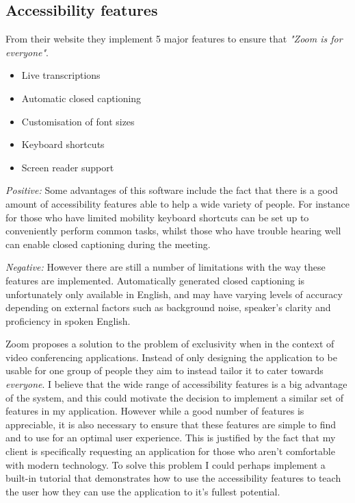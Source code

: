 \subsection*{Accessibility features}

From their website 
\cite{zoom} they implement 5 major features to ensure that 
\textit{"Zoom is for everyone"}. 

\begin{itemize}
  \item Live transcriptions
  \item Automatic closed captioning
  \item Customisation of font sizes
  \item Keyboard shortcuts
  \item Screen reader support
\end{itemize}

\textit{Positive:}
Some advantages of this software include the fact that there
is a good amount of accessibility features able to help a wide
variety of people. For instance for those who have limited 
mobility keyboard shortcuts can be set up to conveniently 
perform common tasks, whilst those who have trouble hearing
well can enable closed captioning during the meeting.

\vspace{0.2cm}

\textit{Negative:}
However there are still a number of limitations with the way 
these features are implemented. Automatically generated 
closed captioning is unfortunately only available in English,
and may have varying levels of accuracy depending on external
factors such as background noise, speaker's clarity and 
proficiency in spoken English.

\vspace{0.2cm}

Zoom proposes a solution to the problem of exclusivity when in 
the context of video conferencing applications. Instead of only
designing the application to be usable for one group of people
they aim to instead tailor it to cater towards 
\textit{everyone}. I believe that the wide range of
accessibility features is a big advantage of the system, and 
this could motivate the decision to implement a similar set
of features in my application. However while a good number of 
features is appreciable, it is also necessary to ensure that 
these features are simple to find and to use for an optimal 
user experience. This is justified by the fact that my client
is specifically requesting an application for those who aren't
comfortable with modern technology. To solve this problem I 
could perhaps implement a built-in tutorial that demonstrates 
how to use the accessibility features to teach the user how 
they can use the application to it's fullest potential.


